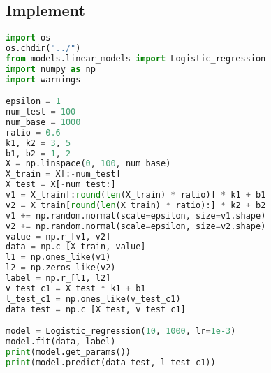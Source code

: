 \documentclass{report}
\begin{document}
\subsection{Implement}
\begin{lstlisting}[language={python}]
import os
os.chdir("../")
from models.linear_models import Logistic_regression
import numpy as np
import warnings

epsilon = 1
num_test = 100
num_base = 1000
ratio = 0.6
k1, k2 = 3, 5
b1, b2 = 1, 2
X = np.linspace(0, 100, num_base)
X_train = X[:-num_test]
X_test = X[-num_test:]
v1 = X_train[:round(len(X_train) * ratio)] * k1 + b1
v2 = X_train[round(len(X_train) * ratio):] * k2 + b2
v1 += np.random.normal(scale=epsilon, size=v1.shape)
v2 += np.random.normal(scale=epsilon, size=v2.shape)
value = np.r_[v1, v2]
data = np.c_[X_train, value]
l1 = np.ones_like(v1)
l2 = np.zeros_like(v2)
label = np.r_[l1, l2]
v_test_c1 = X_test * k1 + b1
l_test_c1 = np.ones_like(v_test_c1)
data_test = np.c_[X_test, v_test_c1]

model = Logistic_regression(10, 1000, lr=1e-3)
model.fit(data, label)
print(model.get_params())
print(model.predict(data_test, l_test_c1))
\end{lstlisting}
\end{document}
